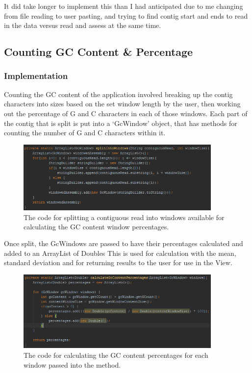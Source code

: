 It did take longer to implement this than I had anticipated due to me changing from file reading to user pasting, and trying to find contig start and ends to read in the data versus read and assess at the same time.

\subsection{Counting GC Content \& Percentage}
\subsubsection{Implementation}
Counting the GC content of the application involved breaking up the contig characters into sizes based on the set window length by the user, then working out the percentage of G and C characters in each of those windows. Each part of the contig that is split is put into a `GcWindow' object, that has methods for counting the number of G and C characters within it.

\begin{figure}[H]
\centering
\includegraphics[width=0.9\textwidth]{images/splitgcwindows}
\caption{The code for splitting a contiguous read into windows available for calculating the GC content window percentages.}
\end{figure}

Once split, the GcWindows are passed to have their percentages calculated and added to an ArrayList of Doubles This is used for calculation with the mean, standard deviation and for returning results to the user for use in the View.

\begin{figure}[H]
\centering
\includegraphics[width=0.9\textwidth]{images/calcgcpercentage}
\caption{The code for calculating the GC content percentages for each window passed into the method.}
\end{figure}

